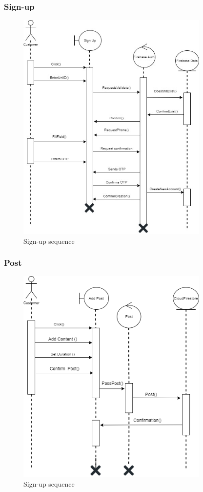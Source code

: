 \documentclass[12pt]{article}
\begin{document}
\subsubsection{Sign-up}
\begin{figure}[h!]
\centerline{\includegraphics[width=0.85\textwidth]{./SequenceDiagram/SequenceDiagram.JPG}}
  \caption{Sign-up sequence}
\end{figure}
\clearpage
\subsubsection{Post}
\begin{figure}[h!]
\centerline{\includegraphics[width=0.85\textwidth]{./SequenceDiagram/SequenceDiagram2.PNG}}
  \caption{Sign-up sequence}
\end{figure}
\end{document}
